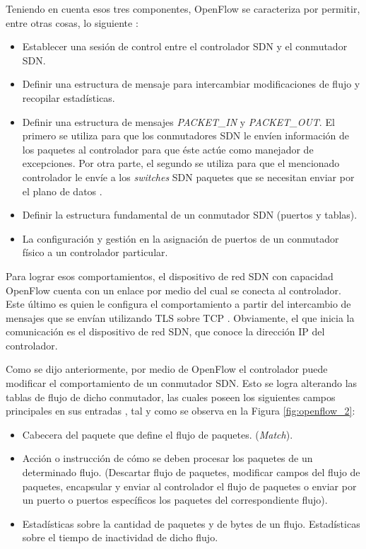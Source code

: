 Teniendo en cuenta esos tres componentes, OpenFlow se caracteriza por permitir,
entre otras cosas, lo siguiente
\parencite{sdn_oreilly}\parencite{sdn_simplified}:

\begin{itemize}
  \item Establecer una sesión de control entre el controlador SDN y el
    conmutador SDN.
  \item Definir una estructura de mensaje para intercambiar modificaciones
    de flujo y recopilar estadísticas.
  \item Definir una estructura de mensajes \textit{PACKET\_IN} y
    \textit{PACKET\_OUT}. El primero se utiliza para que los conmutadores SDN
    le envíen información de los paquetes al controlador para que éste actúe
    como manejador de excepciones. Por otra parte, el segundo se utiliza para
    que el mencionado controlador le envíe a los \textit{switches} SDN paquetes
    que se necesitan enviar por el plano de datos \parencite{sdn_oreilly}.
  \item Definir la estructura fundamental de un conmutador SDN (puertos y
    tablas). 
  \item La configuración y gestión en la asignación de puertos de un
    conmutador físico a un controlador particular.
\end{itemize}

Para lograr esos comportamientos, el dispositivo de red SDN con capacidad
OpenFlow cuenta con un enlace por medio del cual se conecta al controlador. Este
último es quien le configura el comportamiento a partir del intercambio de
mensajes que se envían utilizando TLS sobre TCP \parencite{sdn_oreilly} 
\parencite{sdn_approach}. Obviamente, el que inicia la comunicación es el
dispositivo de red SDN, que conoce la dirección IP del
controlador.

Como se dijo anteriormente, por medio de OpenFlow el controlador puede modificar
el comportamiento de un conmutador SDN. Esto se logra alterando las tablas de
flujo de dicho conmutador, las cuales poseen los siguientes campos principales
en sus entradas \parencite{opf151}, tal y como se observa en la Figura
\ref{fig:openflow_2}:

\begin{itemize}
  \item Cabecera del paquete que define el flujo de paquetes. (\textit{Match}).
  \item Acción o instrucción de cómo se deben procesar los paquetes de un
    determinado flujo. (Descartar flujo de paquetes, modificar campos del flujo
    de paquetes, encapsular y enviar al controlador el flujo de paquetes o
    enviar por un puerto o puertos específicos los paquetes del correspondiente
    flujo).
  \item Estadísticas sobre la cantidad de paquetes y de bytes de un flujo.
    Estadísticas sobre el tiempo de inactividad de dicho flujo.
\end{itemize}

